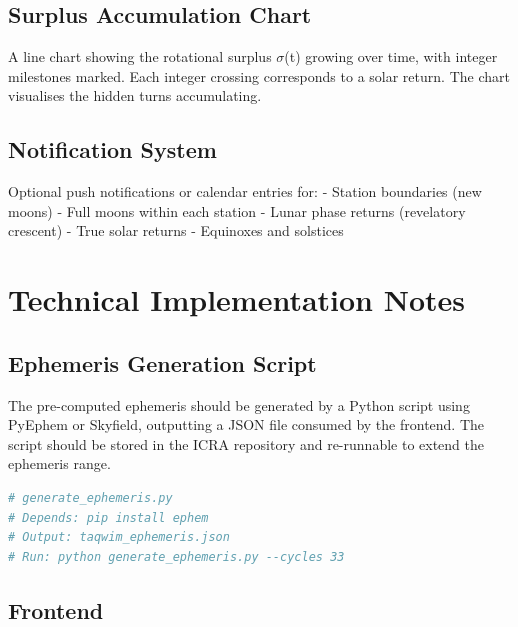 \hypertarget{surplus-accumulation-chart}{%
\subsection{Surplus Accumulation Chart}\label{surplus-accumulation-chart}}

A line chart showing the rotational surplus \(\sigma\)(t) growing over time, with integer milestones marked. Each integer crossing corresponds to a solar return. The chart visualises the hidden turns accumulating.

\hypertarget{notification-system}{%
\subsection{Notification System}\label{notification-system}}

Optional push notifications or calendar entries for:
- Station boundaries (new moons)
- Full moons within each station
- Lunar phase returns (revelatory crescent)
- True solar returns
- Equinoxes and solstices

\hypertarget{technical-implementation-notes}{%
\section{Technical Implementation Notes}\label{technical-implementation-notes}}

\hypertarget{ephemeris-generation-script}{%
\subsection{Ephemeris Generation Script}\label{ephemeris-generation-script}}

The pre-computed ephemeris should be generated by a Python script using PyEphem or Skyfield, outputting a JSON file consumed by the frontend. The script should be stored in the ICRA repository and re-runnable to extend the ephemeris range.

\begin{lstlisting}[language=Python]
# generate_ephemeris.py
# Depends: pip install ephem
# Output: taqwim_ephemeris.json
# Run: python generate_ephemeris.py --cycles 33
\end{lstlisting}

\hypertarget{frontend}{%
\subsection{Frontend}\label{frontend}}


